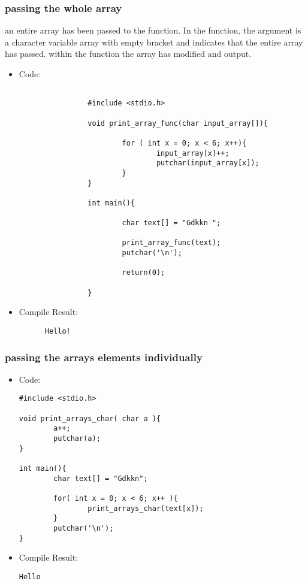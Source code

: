 \subsubsection{passing the whole array}
an entire array has been passed to the function. In the function, the argument is
a character variable array with empty bracket and indicates that the entire array
has passed. within the function the array has modified and output.
        \begin{itemize}
        \item Code:
        \begin{lstlisting}
     
                #include <stdio.h>

                void print_array_func(char input_array[]){
                
                        for ( int x = 0; x < 6; x++){
                                input_array[x]++;
                                putchar(input_array[x]);
                        }
                }
                
                int main(){
                
                        char text[] = "Gdkkn ";
                
                        print_array_func(text);
                        putchar('\n');
                
                        return(0);
                
                }

      \end{lstlisting}
      \item Compile Result:
      \begin{lstlisting}
      Hello!
      \end{lstlisting}
      \end{itemize}

\break
\subsubsection{passing the arrays elements individually}
\begin{itemize}
  \item Code:
\begin{lstlisting}
#include <stdio.h>

void print_arrays_char( char a ){
        a++;
        putchar(a);
}

int main(){
        char text[] = "Gdkkn";

        for( int x = 0; x < 6; x++ ){
                print_arrays_char(text[x]);
        }
        putchar('\n');
}
\end{lstlisting}
\item Compile Result:
\begin{lstlisting}
Hello
\end{lstlisting}
\end{itemize}

